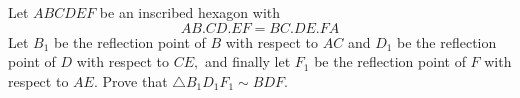 Let $ABCDEF$ be an inscribed hexagon with
$$AB.CD.EF=BC.DE.FA$$
Let $B_1$ be the reflection point of $B$ with respect to $AC$ and $D_1$ be the reflection point of $D$ with respect to $CE,$ and finally let $F_1$ be the reflection point of $F$ with respect to $AE.$ Prove that $\triangle B_1D_1F_1\sim BDF.$